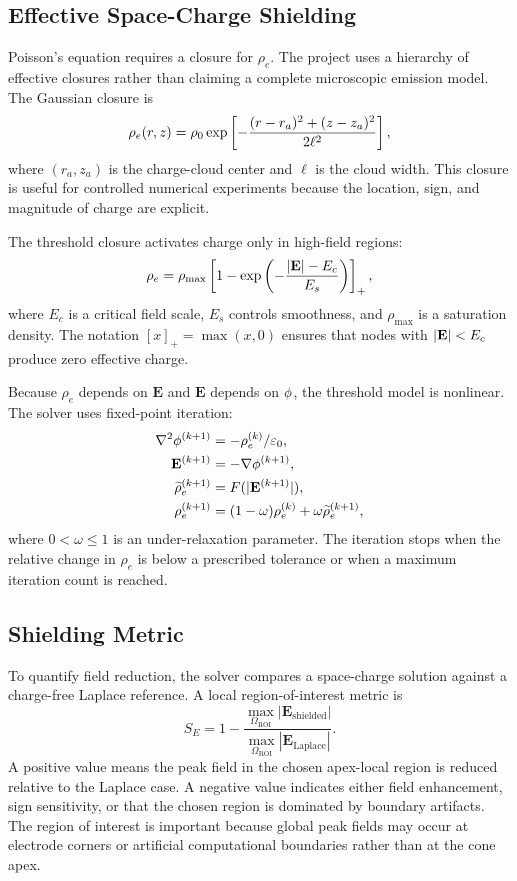 \subsection{Effective Space-Charge Shielding}

Poisson's equation requires a closure for $\rho_e$. The project uses a hierarchy of effective closures rather than claiming a complete microscopic emission model. The Gaussian closure is
\begin{equation}
\rho_e(r,z)=\rho_0\exp\left[-\frac{(r-r_a)^2+(z-z_a)^2}{2\ell^2}\right],
\label{eq:gaussian_full}
\end{equation}
where $(r_a,z_a)$ is the charge-cloud center and $\ell$ is the cloud width. This closure is useful for controlled numerical experiments because the location, sign, and magnitude of charge are explicit.

The threshold closure activates charge only in high-field regions:
\begin{equation}
\rho_e = \rho_{\max}\left[1-\exp\left(-\frac{|\mathbf{E}|-E_c}{E_s}\right)\right]_+,
\label{eq:threshold_full}
\end{equation}
where $E_c$ is a critical field scale, $E_s$ controls smoothness, and $\rho_{\max}$ is a saturation density. The notation $[x]_+=\max(x,0)$ ensures that nodes with $|\mathbf{E}|<E_c$ produce zero effective charge.

Because $\rho_e$ depends on $\mathbf{E}$ and $\mathbf{E}$ depends on $\phi$, the threshold model is nonlinear. The solver uses fixed-point iteration:
\begin{align}
    \nabla^2\phi^{(k+1)}&=-\rho_e^{(k)}/\varepsilon_0,\\
    \mathbf{E}^{(k+1)}&=-\nabla\phi^{(k+1)},\\
    \widetilde{\rho}_e^{(k+1)}&=F(|\mathbf{E}^{(k+1)}|),\\
    \rho_e^{(k+1)}&=(1-\omega)\rho_e^{(k)}+\omega\widetilde{\rho}_e^{(k+1)},
\end{align}
where $0<\omega\le1$ is an under-relaxation parameter. The iteration stops when the relative change in $\rho_e$ is below a prescribed tolerance or when a maximum iteration count is reached.

\subsection{Shielding Metric}

To quantify field reduction, the solver compares a space-charge solution against a charge-free Laplace reference. A local region-of-interest metric is
\begin{equation}
    S_E=1-\frac{\max_{\Omega_{\mathrm{ROI}}}|\mathbf{E}_{\mathrm{shielded}}|}
    {\max_{\Omega_{\mathrm{ROI}}}|\mathbf{E}_{\mathrm{Laplace}}|}.
\end{equation}
A positive value means the peak field in the chosen apex-local region is reduced relative to the Laplace case. A negative value indicates either field enhancement, sign sensitivity, or that the chosen region is dominated by boundary artifacts. The region of interest is important because global peak fields may occur at electrode corners or artificial computational boundaries rather than at the cone apex.

